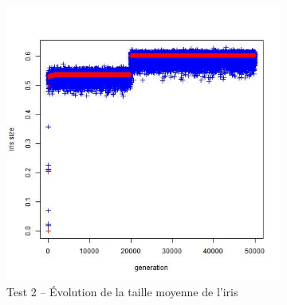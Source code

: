 \documentclass[a4paper,11pt]{article}
\begin{document}
%



\begin{figure}
\centering
\begin{subfigure}{.5\textwidth}
  \centering
\includegraphics[width=1\linewidth]{1487424485848_evolution_average_iris_size.jpeg}
\caption{Test 2 – Évolution de la taille moyenne de l'iris}
\label{fig:sub23}
\end{subfigure}%
\begin{subfigure}{.5\textwidth}
  \centering

\end{subfigure}
\end{figure}
\end{document}
